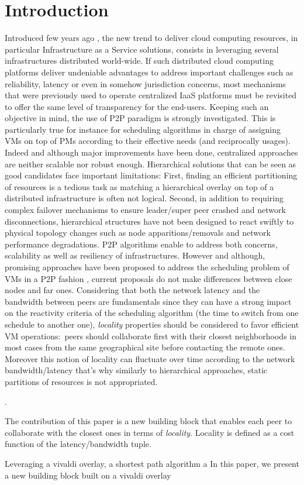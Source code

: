 \section{Introduction} Introduced few years ago \cite{greenberg:sigcomm09}, the
new trend to deliver cloud computing resources, in particular Infrastructure as
a Service solutions, consists in leveraging several infrastructures
distributed world-wide. If such distributed cloud computing platforms deliver
undeniable advantages to address important challenges such as reliability,
latency or even in somehow jurisdiction concerns, most mechanisms that were
previously used to operate centralized IaaS platforms must be revisited to
offer the same level of transparency for the end-users.  Keeping such an
objective in mind, the use of P2P paradigm is strongly investigated. This is
particularly true for instance for scheduling algorithms in charge of assigning
VMs on top of PMs according to their effective needs (and reciprocally usages).
Indeed and although major improvements have been done, centralized approaches
\cite{hermenier:2013} are neither scalable nor robust enough.  Hierarchical
solutions \cite{feller:ccgrid12} that can be seen as good candidates face
important limitations: First, finding an efficient partitioning of resources is
a tedious task as matching a hierarchical overlay on top of a distributed
infrastructure is often not logical.  Second, in addition to requiring complex
failover mechanisms to ensure leader/super peer crashed and network
disconnections, hierarchical structures have not been designed to react swiftly
to physical topology changes such as node apparitions/removals and network
performance degradations.  P2P algorithms enable to address both concerns, \ie
scalability as well as resiliency of infrastructures. However and although,
promising approaches have been proposed to address the scheduling problem of
VMs in a P2P fashion \cite{xxx,quesnel:2012,feller:cloudcom12}, current
proposals do not make differences between close nodes and far ones.
Considering that both the network latency and the bandwidth between peers are fundamentals since
they can have a strong impact on the reactivity criteria of the scheduling
algorithm (\ie the time to switch from one schedule to another one), \emph{locality} properties should be considered to favor 
efficient VM operations:~\eg  peers should collaborate first with their closest
neighborhoods in most cases from the same geographical site before contacting
the remote ones.  Moreover this notion of locality can fluctuate over time
according to the network bandwidth/latency that's why similarly to hierarchical
approaches, static partitions of resources is not appropriated. 
  
. 

The contribution of this paper is a new building block that enables each peer
to collaborate with the closest ones in terms of \emph{locality}. Locality is
defined as a cost function of the latency/bandwidth tuple. 


Leveraging a vivaldi overlay, a shortest path algorithm  a
In this paper, we present a new building block built on a vivaldi overlay 
 
 
